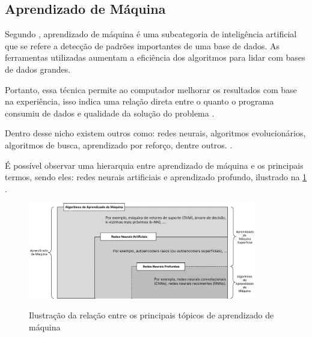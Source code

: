 \subsection{Aprendizado de Máquina}

Segundo , aprendizado de máquina é uma subcategoria de inteligência artificial que se refere  a detecção de padrões importantes de uma base de dados. As ferramentas utilizadas aumentam a eficiência dos algoritmos para lidar com bases de dados grandes.

Portanto, essa técnica permite ao computador melhorar os resultados com base na experiência, isso indica uma relação direta entre o quanto o programa consumiu de dados e qualidade da solução do problema \space\cite{ml_explicado}.

Dentro desse nicho existem outros como: redes neurais, algoritmos evolucionários, algoritmos de busca, aprendizado por reforço, dentre outros. \space\cite{ml_oil_gas_industry}.

É possível observar uma hierarquia entre aprendizado de máquina e os principais termos, sendo eles: redes neurais artificiais e aprendizado profundo, ilustrado na \cref{fig:diagrama_ann} \space\cite{ml_and_dp}.

\begin{figure}[ht]
	\caption{Ilustração da relação entre os principais tópicos de aprendizado de máquina}
	\centering %
	\includegraphics[width=10cm]{figures/diagrama_ann.png} %
	\label{fig:diagrama_ann}
\end{figure}
